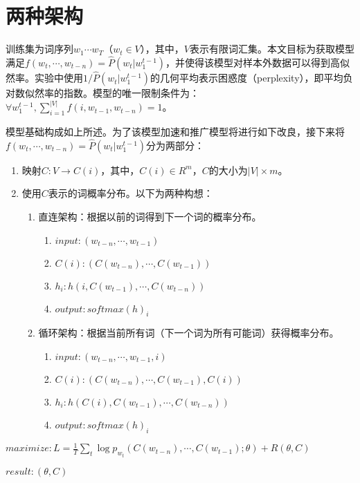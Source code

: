 \documentclass[UTF8]{ctexart}
\begin{document}
\section{两种架构}
\par{训练集为词序列$w_{1}\cdots w_{T}$（$w_{t}\in V$），其中，$V$表示有限词汇集。本文目标为获取模型满足$f(w_{t},\cdots,w_{t-n})=\widehat{P}(w_{t}|w_{1}^{t-1})$，并使得该模型对样本外数据可以得到高似然率。实验中使用$1/\widehat{P}(w_t|w_{1}^{t-1})$的几何平均表示困惑度（perplexity），即平均负对数似然率的指数。模型的唯一限制条件为：$\forall w_{1}^{t-1}, \sum _{i=1}^{|V|}f(i,w_{t-1},w_{t-n})=1$。}
\par{模型基础构成如上所述。为了该模型加速和推广模型将进行如下改良，接下来将$f(w_{t},\cdots,w_{t-n})=\widehat{P}(w_{t}|w_{1}^{t-1})$分为两部分：}
\begin{enumerate}
  \item 映射$C:V\rightarrow C(i)$，其中，$C(i)\in R^{m}$，$C$的大小为$|V| \times m$。
  \item 使用$C$表示的词概率分布。以下为两种构想：
  \begin{enumerate}
    \item 直连架构：根据以前的词得到下一个词的概率分布。
    \begin{enumerate}
      \item $input:(w_{t-n},\cdots,w_{t-1})$
      \item $C(i):(C(w_{t-n}),\cdots,C(w_{t-1}))$
      \item $h_{i}:h(i,C(w_{t-1}),\cdots,C(w_{t-n}))$
      \item $output:softmax(h)_{i}$
    \end{enumerate}
    \item 循环架构：根据当前所有词（下一个词为所有可能词）获得概率分布。
    \begin{enumerate}
      \item $input:(w_{t-n},\cdots,w_{t-1},i)$
      \item $C(i):(C(w_{t-n}),\cdots,C(w_{t-1}),C(i))$
      \item $h_{i}:h(C(i),C(w_{t-1}),\cdots,C(w_{t-n}))$
      \item $output:softmax(h)_{i}$
    \end{enumerate}
  \end{enumerate}
\end{enumerate}
\par{$maximize:L=\frac{1}{T}\sum_{t}\log p_{w_{t}}(C(w_{t-n}),\cdots,C(w_{t-1});\theta)+R(\theta,C)$}
\par{$result:(\theta,C)$}
\end{document}
